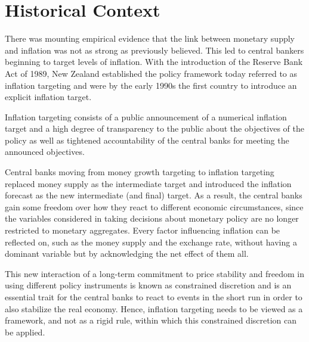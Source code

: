 \documentclass[11pt,a4paper,oneside]{book}
\begin{document}
\section{Historical Context}
\label{sec:Historical_Context}

There was mounting empirical evidence that the link between monetary supply and inflation was not as strong as previously believed. This led to central bankers beginning to target levels of inflation. With the introduction of the Reserve Bank Act of 1989, New Zealand established the policy framework today referred to as inflation targeting and were by the early 1990s the first country to introduce an explicit inflation target.

Inflation targeting consists of a public announcement of a numerical inflation target and a high degree of transparency to the public about the objectives of the policy as well as tightened accountability of the central banks for meeting the announced objectives.

Central banks moving from money growth targeting to inflation targeting replaced money supply as the intermediate target and introduced the inflation forecast as the new intermediate (and final) target. As a result, the central banks gain some freedom over how they react to different economic circumstances, since the variables considered in taking decisions about monetary policy are no longer restricted to monetary aggregates. Every factor influencing inflation can be reflected on, such as the money supply and the exchange rate, without having a dominant variable but by acknowledging the net effect of them all. 

This new interaction of a long-term commitment to price stability and freedom in using different policy instruments is known as constrained discretion and is an essential trait for the central banks to react to events in the short run in order to also stabilize the real economy. Hence, inflation targeting needs to be viewed as a framework, and not as a rigid rule, within which this constrained discretion can be applied. 
\end{document}

